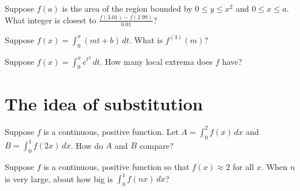 \documentclass{ximera}
\begin{document}
\begin{problem}
  Suppose $f(a)$ is the area of the region bounded by $0 \leq y \leq x^2$ and $0 \leq x \leq a$.  What integer is closest to $\frac{f(3.01) - f(2.99)}{0.01}$?
  \begin{multipleChoice}
  \end{multipleChoice}
\end{problem}

\begin{problem}
  Suppose $f(x) = \int_0^x \left( mt + b \right) \, dt$.  What is $f^{(3)}(m)$?
  \begin{multipleChoice}
  \end{multipleChoice}
\end{problem}

\begin{problem}
  Suppose $f(x) = \int_0^x e^{t^2} \, dt$.  How many local extrema does $f$ have?
  \begin{multipleChoice}
  \end{multipleChoice}
\end{problem}

\clearpage

\section{The idea of substitution}

\begin{problem}
  Suppose $f$ is a continuous, positive function.  Let $A = \int_0^2 f(x) \, dx$ and $B = \int_0^1 f(2x) \, dx$.  How do $A$ and $B$ compare?
  \begin{multipleChoice}
  \end{multipleChoice}
\end{problem}

\begin{problem}
  Suppose $f$ is a continuous, positive function so that $f(x) \approx 2$ for all $x$.  When $n$ is very large, about how big is $\int_0^1 f(nx) \, dx$?
  \begin{multipleChoice}
   \end{multipleChoice}
\end{problem}
\end{document}
